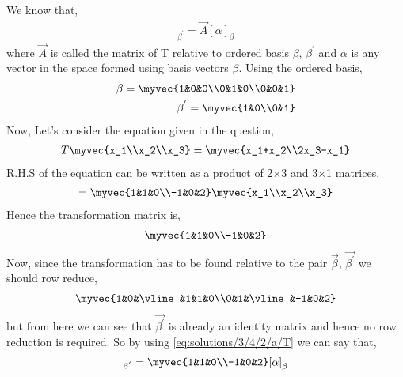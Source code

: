 We know that,
\begin{align}
[T\alpha]_{\beta^{'}}=\vec{A}[\alpha]_{\beta}\label{eq:solutions/3/4/2/a/T}
\end{align}
where $\vec{A}$ is called the matrix of T relative to ordered basis $\beta$, $\beta^{'}$ and $\alpha$ is any vector in the space formed using basis vectors $\beta$.
Using the ordered basis,
\begin{align}
\beta=\myvec{1&0&0\\0&1&0\\0&0&1}\\
\beta^{'}=\myvec{1&0\\0&1}
\end{align}
Now, Let's consider the equation given in the question,
\begin{align}
T\myvec{x_1\\x_2\\x_3}=\myvec{x_1+x_2\\2x_3-x_1}
\end{align}
R.H.S of the equation can be written as a product of 2$\times$3 and 3$\times$1 matrices,
\begin{align}
=\myvec{1&1&0\\-1&0&2}\myvec{x_1\\x_2\\x_3}
\end{align}
Hence the transformation matrix is,
\begin{align}
\myvec{1&1&0\\-1&0&2}
\end{align}
Now, since the transformation has to be found relative to the pair $\vec{\beta}$, $\vec{\beta^{'}}$ we should row reduce,
\begin{align}
\myvec{1&0&\vline&1&1&0\\0&1&\vline&-1&0&2}
\end{align}
but from here we can see that $\vec{\beta^{'}}$ is already an identity matrix and hence no row reduction is required. So by using \eqref{eq:solutions/3/4/2/a/T} we can say that,
\begin{align}
[T\alpha]_{\beta^{'}}=\myvec{1&1&0\\-1&0&2}[\alpha]_{\beta}
\end{align}

